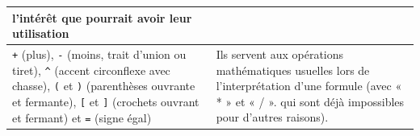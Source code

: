 \begin{tabular}{p{}p{}}
  l'intérêt que pourrait avoir leur utilisation\\
  \hline
  \texttt{+} (plus),\newline
  \texttt{-} (moins, trait d'union ou tiret),\newline
  \texttt{\^{}} (accent circonflexe avec chasse),\newline
  \texttt{(} et \texttt{)} (parenthèses ouvrante et fermante),\newline
  \texttt{[} et \texttt{]} (crochets ouvrant et fermant) et\newline
  \texttt{=} (signe égal) & Ils servent aux opérations
  mathématiques usuelles lors de l'interprétation d'une formule (avec « * » et
  « / ». qui sont déjà impossibles pour d'autres raisons).\\
  \hline
\end{tabular}
